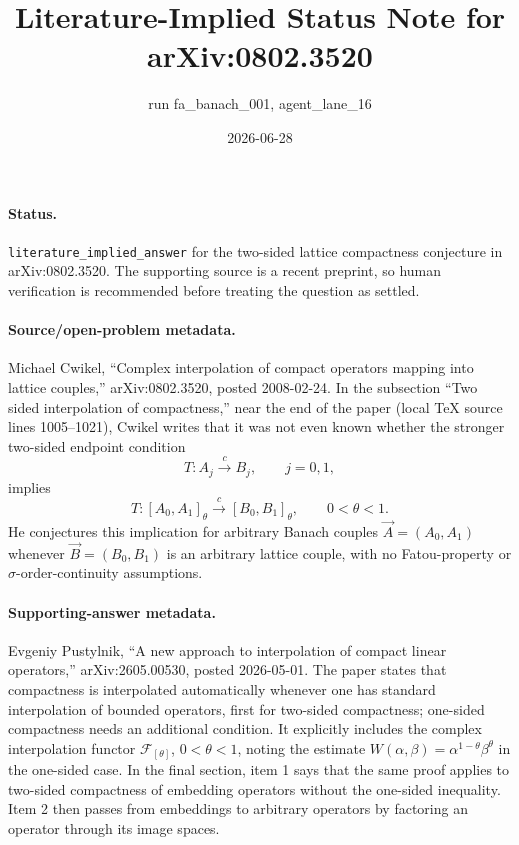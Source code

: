 \documentclass[11pt]{article}
\title{Literature-Implied Status Note for arXiv:0802.3520}
\author{run fa\_banach\_001, agent\_lane\_16}
\date{2026-06-28}
\begin{document}
\maketitle

\paragraph{Status.}
\texttt{literature\_implied\_answer} for the two-sided lattice compactness
conjecture in arXiv:0802.3520. The supporting source is a recent preprint, so
human verification is recommended before treating the question as settled.

\paragraph{Source/open-problem metadata.}
Michael Cwikel, ``Complex interpolation of compact operators mapping into
lattice couples,'' arXiv:0802.3520, posted 2008-02-24. In the subsection
``Two sided interpolation of compactness,'' near the end of the paper
(local TeX source lines 1005--1021), Cwikel writes that it was not even known
whether the stronger two-sided endpoint condition
\[
  T:A_j \overset{c}{\longrightarrow} B_j, \qquad j=0,1,
\]
implies
\[
  T:[A_0,A_1]_\theta \overset{c}{\longrightarrow}
  [B_0,B_1]_\theta,\qquad 0<\theta<1.
\]
He conjectures this implication for arbitrary Banach couples
\(\vec A=(A_0,A_1)\) whenever \(\vec B=(B_0,B_1)\) is an arbitrary lattice
couple, with no Fatou-property or \(\sigma\)-order-continuity assumptions.

\paragraph{Supporting-answer metadata.}
Evgeniy Pustylnik, ``A new approach to interpolation of compact linear
operators,'' arXiv:2605.00530, posted 2026-05-01. The paper states that
compactness is interpolated automatically whenever one has standard
interpolation of bounded operators, first for two-sided compactness; one-sided
compactness needs an additional condition. It explicitly includes the complex
interpolation functor \(\mathcal F_{[\theta]}\), \(0<\theta<1\), noting the
estimate \(W(\alpha,\beta)=\alpha^{1-\theta}\beta^\theta\) in the one-sided
case. In the final section, item 1 says that the same proof applies to
two-sided compactness of embedding operators without the one-sided inequality.
Item 2 then passes from embeddings to arbitrary operators by factoring an
operator through its image spaces.
\end{document}
